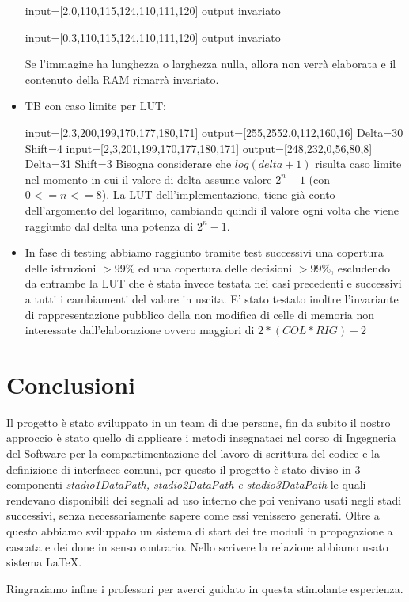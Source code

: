 \documentclass{article}
\begin{document}
\begin{itemize}
 input=[2,0,110,115,124,110,111,120] 
 output invariato
 
  input=[0,3,110,115,124,110,111,120]  
 output invariato
 
 Se l'immagine ha lunghezza o larghezza nulla, allora non verrà elaborata e il contenuto della RAM rimarrà invariato. 
\newpage
 \item TB con caso limite per LUT: 
 
  input=[2,3,200,199,170,177,180,171] 
 output=[255,2552,0,112,160,16]
 \newline
 Delta=30 Shift=4
  \newline
 input=[2,3,201,199,170,177,180,171] 
 output=[248,232,0,56,80,8]
  \newline
 Delta=31 Shift=3
  \newline
  Bisogna considerare che \(log (delta +1)\) risulta caso limite nel momento in cui il valore di delta assume valore \(2^{n}-1\) (con \(0<=n<=8\)). La LUT dell'implementazione, tiene già conto dell'argomento del logaritmo, cambiando quindi il valore ogni volta che viene raggiunto dal delta una potenza di \(2^{n}-1\).  
	\item In fase di testing abbiamo raggiunto tramite test successivi una copertura delle istruzioni \(>99\%\) ed una copertura delle decisioni \(>99\%\), escludendo da entrambe la LUT che è stata invece testata nei casi precedenti e successivi a tutti i cambiamenti del valore in uscita. E' stato testato inoltre l'invariante di rappresentazione pubblico della non modifica di celle di memoria non interessate dall'elaborazione ovvero maggiori di \(2*(COL * RIG) + 2 \)
\end{itemize}
\section{Conclusioni}
Il progetto è stato sviluppato in un team di due persone, fin da subito il nostro approccio è stato quello di applicare i metodi insegnataci nel corso di Ingegneria del Software per la compartimentazione del lavoro di scrittura del codice e la definizione di interfacce comuni, per questo il progetto è stato diviso in 3 componenti \emph{stadio1DataPath, stadio2DataPath \emph{e} stadio3DataPath} le quali rendevano disponibili dei segnali ad uso interno che poi venivano usati negli stadi successivi, senza necessariamente sapere come essi venissero generati. Oltre a questo abbiamo sviluppato un sistema di start dei tre moduli in propagazione a cascata e dei done in senso contrario. Nello scrivere la relazione abbiamo usato sistema LaTeX.

Ringraziamo infine i professori per averci guidato in questa stimolante esperienza.
\end{document}
